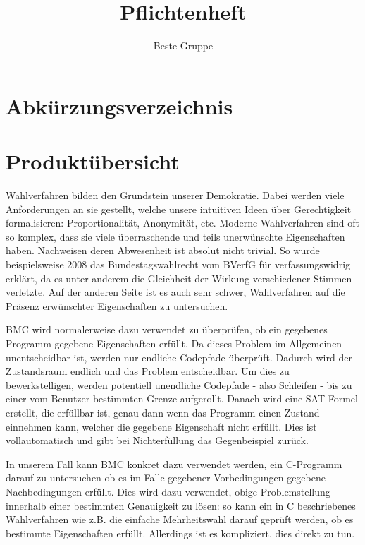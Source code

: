 \documentclass[a4paper]{scrreprt}
\begin{document}
\title{Pflichtenheft}
\author{Beste Gruppe}
\maketitle 

\tableofcontents	

\listoffigures

\chapter*{Abkürzungsverzeichnis}
\begin{acronym} %
\end{acronym}
 
\chapter{Produktübersicht}
Wahlverfahren bilden den Grundstein unserer Demokratie. Dabei werden viele Anforderungen an sie gestellt, welche unsere intuitiven Ideen über Gerechtigkeit formalisieren: Proportionalität, Anonymität, etc. Moderne Wahlverfahren sind oft so komplex, dass sie viele überraschende und teils unerwünschte Eigenschaften haben. Nachweisen deren Abwesenheit ist absolut nicht trivial. So wurde beispielsweise 2008 das Bundestagswahlrecht vom BVerfG für verfassungswidrig erklärt, da es unter anderem die Gleichheit der Wirkung verschiedener Stimmen verletzte. Auf der anderen Seite ist es auch sehr schwer, Wahlverfahren auf die Präsenz erwünschter Eigenschaften zu untersuchen.

\ac{BMC} wird normalerweise dazu verwendet zu überprüfen, ob ein gegebenes Programm gegebene Eigenschaften erfüllt. Da dieses Problem im Allgemeinen unentscheidbar ist, werden nur endliche Codepfade überprüft. Dadurch wird der Zustandsraum endlich und das Problem entscheidbar. Um dies zu bewerkstelligen, werden potentiell unendliche Codepfade - also Schleifen - bis zu einer vom \gls{Benutzer} bestimmten Grenze aufgerollt. Danach wird eine SAT-Formel erstellt, die erfüllbar ist, genau dann wenn das Programm einen Zustand einnehmen kann, welcher die gegebene Eigenschaft nicht erfüllt. Dies ist vollautomatisch und gibt bei Nichterfüllung das Gegenbeispiel zurück.  

In unserem Fall kann \ac{BMC} konkret dazu verwendet werden, ein C-Programm darauf zu untersuchen ob es im Falle gegebener Vorbedingungen gegebene Nachbedingungen erfüllt. Dies wird dazu verwendet, obige Problemstellung innerhalb einer bestimmten Genauigkeit zu lösen: so kann ein in C beschriebenes Wahlverfahren wie z.B. die einfache Mehrheitswahl darauf geprüft werden, ob es bestimmte Eigenschaften erfüllt. Allerdings ist es kompliziert, dies direkt zu tun. 
\end{document}
